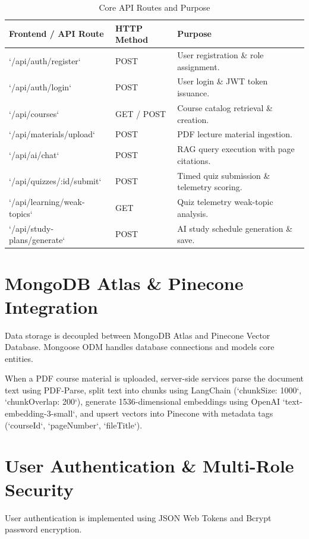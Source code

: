 \begin{table}[H]
\centering
\caption{Core API Routes and Purpose}
\label{tab:routes}
\begin{tabular}{p{} p{} p{}}
\toprule
\textbf{Frontend / API Route} & \textbf{HTTP Method} & \textbf{Purpose} \\
\midrule
`/api/auth/register` & POST & User registration \& role assignment. \\
`/api/auth/login` & POST & User login \& JWT token issuance. \\
`/api/courses` & GET / POST & Course catalog retrieval \& creation. \\
`/api/materials/upload` & POST & PDF lecture material ingestion. \\
`/api/ai/chat` & POST & RAG query execution with page citations. \\
`/api/quizzes/:id/submit` & POST & Timed quiz submission \& telemetry scoring. \\
`/api/learning/weak-topics` & GET & Quiz telemetry weak-topic analysis. \\
`/api/study-plans/generate` & POST & AI study schedule generation \& save. \\
\bottomrule
\end{tabular}
\end{table}

\section{MongoDB Atlas \& Pinecone Integration}

Data storage is decoupled between MongoDB Atlas and Pinecone Vector Database. Mongoose ODM handles database connections and models core entities.

When a PDF course material is uploaded, server-side services parse the document text using PDF-Parse, split text into chunks using LangChain (`chunkSize: 1000`, `chunkOverlap: 200`), generate 1536-dimensional embeddings using OpenAI `text-embedding-3-small`, and upsert vectors into Pinecone with metadata tags (`courseId`, `pageNumber`, `fileTitle`).

\section{User Authentication \& Multi-Role Security}

User authentication is implemented using JSON Web Tokens and Bcrypt password encryption.


